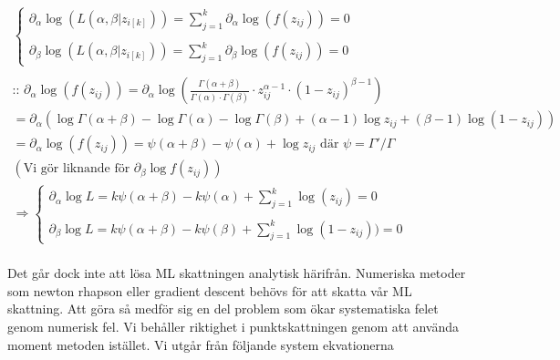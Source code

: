 \documentclass{assignment}
\begin{document}
\begin{align*}
    \left\{\begin{matrix}
        \partial_{\alpha}\log(L(\alpha,\beta|z_{i[k]})) = \sum_{j=1}^k \partial_\alpha \log(f(z_{ij})) = 0
        \\ \\ \partial_{\beta}\log(L(\alpha,\beta|z_{i[k]})) = \sum_{j=1}^k \partial_\beta \log(f(z_{ij})) = 0
        \end{matrix}\right.
    \\ 
    \\ \text{:: } \partial_\alpha\log(f(z_{ij})) = \partial_\alpha\log \left( \frac{\Gamma(\alpha + \beta)}{\Gamma(\alpha) \cdot \Gamma(\beta)} \cdot z_{ij}^{\alpha-1} \cdot (1-z_{ij})^{\beta-1}\right) 
    \\  = \partial_\alpha \left(\log \Gamma(\alpha + \beta) - \log\Gamma(\alpha) - \log \Gamma(\beta) + (\alpha-1) \log z_{ij} + (\beta-1)\log (1-z_{ij}) \right)
    \\  = \partial_\alpha\log(f(z_{ij})) = \psi(\alpha+\beta) - \psi(\alpha) + \log z_{ij} \text{  där  } \psi = \Gamma ' / \Gamma 
    \\ \left(\text{Vi gör liknande för } \partial_\beta \log f(z_{ij}) \right)
    \\ \Rightarrow 
    \left\{\begin{matrix}
        \partial_{\alpha}\log L= k\psi(\alpha+\beta)-k\psi(\alpha) + \sum_{j=1}^k\log(z_{ij}) = 0
        \\ \\ \partial_{\beta}\log L= k\psi(\alpha+\beta)-k\psi(\beta) + \sum_{j=1}^k\log(1-z_{ij})) = 0
        \end{matrix}\right.
\end{align*}
\\ Det går dock inte att lösa ML skattningen analytisk härifrån. Numeriska metoder som newton rhapson eller gradient descent
behövs för att skatta vår ML skattning. Att göra så medför sig en del problem som ökar systematiska felet genom
numerisk fel. Vi behåller riktighet i punktskattningen genom att använda moment metoden istället. Vi utgår från följande
system ekvationerna
\end{document}

